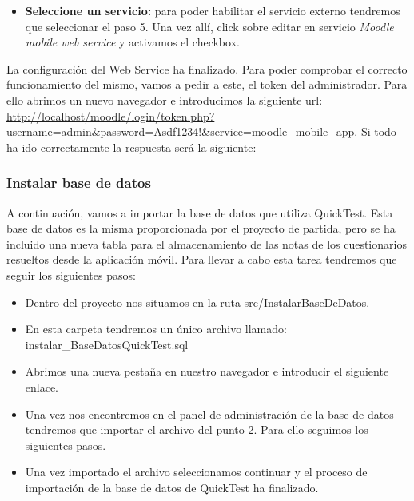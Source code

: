 \begin{itemize}
\begin{itemize}
		\item \textbf{Seleccione un servicio:} para poder habilitar el servicio externo tendremos que seleccionar el paso 5. Una vez allí, click sobre editar en servicio \emph{Moodle mobile web service} y activamos el checkbox.
		
	
	\end{itemize}
	
La configuración del Web Service ha finalizado. Para poder comprobar el correcto funcionamiento del mismo, vamos a pedir a este, el token del administrador. Para ello abrimos un nuevo navegador e introducimos la siguiente url: \url{http://localhost/moodle/login/token.php?username=admin&password=Asdf1234!&service=moodle_mobile_app}. Si todo ha ido correctamente la respuesta será la siguiente:
	
\end{itemize}

\subsubsection{Instalar base de datos}

A continuación, vamos a importar la base de datos que utiliza QuickTest. Esta base de datos es la misma proporcionada por el proyecto de partida, pero se ha incluido una nueva tabla para el almacenamiento de las notas de los cuestionarios resueltos desde la aplicación móvil. Para llevar a cabo esta tarea tendremos que seguir los siguientes pasos:

\begin{itemize}

	\item Dentro del proyecto nos situamos en la ruta src/InstalarBaseDeDatos.
	
	\item En esta carpeta tendremos un único archivo llamado: instalar\_BaseDatosQuickTest.sql
	
	\item Abrimos una nueva pestaña en nuestro navegador e introducir el siguiente enlace. 
	
	\item Una vez nos encontremos en el panel de administración de la base de datos tendremos que importar el archivo del punto 2. Para ello seguimos los siguientes pasos. 
	
	\item Una vez importado el archivo seleccionamos continuar y el proceso de importación de la base de datos de QuickTest ha finalizado.

\end{itemize}

